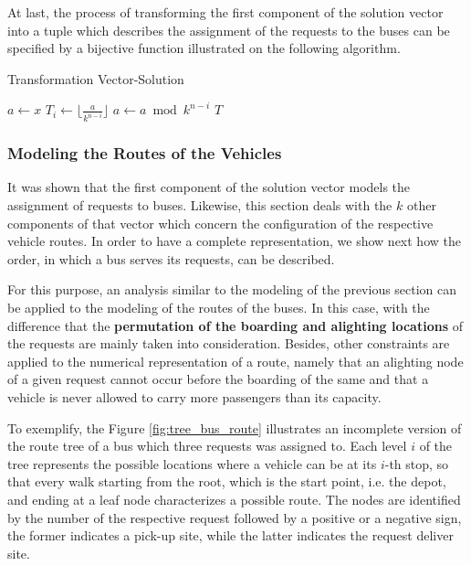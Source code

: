 \documentclass[tuberlin,cic,tc,openright,english,noabntcite,oneside]{iiufrgs}
\begin{document}
At last, the process of transforming the first component of the solution vector into a tuple which describes the assignment of the requests to the buses can be specified by a bijective function illustrated on the following algorithm.
\begin{algorithm}[H]
\caption{Transformation Vector-Solution}
\begin{algorithmic}
\State $a \gets x$
	\State $\displaystyle T_{i} \gets \lfloor \frac{a}{k^{n-i}} \rfloor$
	\State $a \gets a \bmod k^{n-i}$
\EndFor
\State \Return $T$
\EndFunction
\end{algorithmic}
\end{algorithm}

\subsubsection{Modeling the Routes of the Vehicles}
It was shown that the first component of the solution vector models the assignment of requests to buses. Likewise, this section deals with the $k$ other components of that vector which concern the configuration of the respective vehicle routes. In order to have a complete representation, we show next how the order, in which a bus serves its requests, can be described.

For this purpose, an analysis similar to the modeling of the previous section can be applied to the modeling of the routes of the buses. In this case, with the difference that the \textbf{permutation of the boarding and alighting locations} of the requests are mainly taken into consideration. Besides, other constraints are applied to the numerical representation of a route, namely that an alighting node of a given request cannot occur before the boarding of the same and that a vehicle is never allowed to carry more passengers than its capacity.

To exemplify, the Figure \ref{fig:tree_bus_route} illustrates an incomplete version of the route tree of a bus which three requests was assigned to. Each level $i$ of the tree represents the possible locations where a vehicle can be at its $i$-th stop, so that every walk starting from the root, which is the start point, i.e. the depot, and ending at a leaf node characterizes a possible route. The nodes are identified by the number of the respective request followed by a positive or a negative sign, the former indicates a pick-up site, while the latter indicates the request deliver site.
\end{document}
